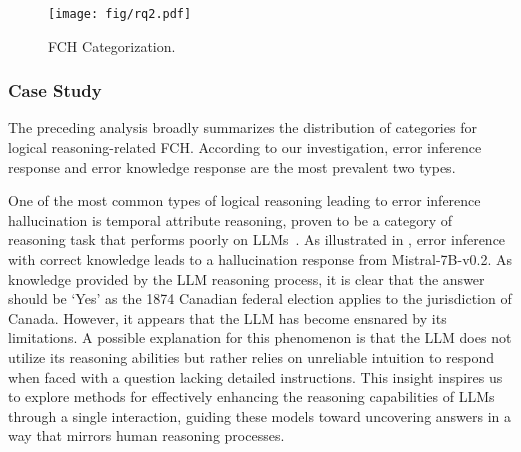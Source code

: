 \begin{figure}
\centering
\texttt{[image: fig/rq2.pdf]}\\
    \vspace{-0.1cm}
    \caption{FCH Categorization.}
    \vspace{-0.3cm}
    \label{fig:rq2}
\end{figure}

\subsubsection{Case Study}
The preceding analysis broadly summarizes the distribution of categories for logical reasoning-related FCH. According to our investigation, error inference response and error knowledge response are the most prevalent two types.

One of the most common types of logical reasoning leading to error inference hallucination is temporal attribute reasoning, proven to be a category of reasoning task that performs poorly on LLMs~\cite{qiu2023large}. %
As illustrated in , error inference with correct knowledge leads to a hallucination response from Mistral-7B-v0.2. As knowledge provided by the LLM reasoning process, it is clear that the answer should be `Yes' as the 1874 Canadian federal election applies to the jurisdiction of Canada. However, it appears that the LLM has become ensnared by its limitations.
A possible explanation for this phenomenon is that the LLM does not utilize its reasoning abilities but rather relies on unreliable intuition to respond when faced with a question lacking detailed instructions. This insight inspires us to explore methods for effectively enhancing the reasoning capabilities of LLMs through a single interaction, guiding these models toward uncovering answers in a way that mirrors human reasoning processes.

